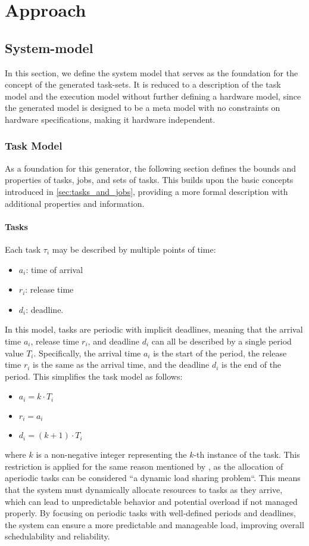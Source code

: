 \chapter{Approach}
\section{System-model}\label{sec:model}
In this section, we define the system model that serves as the foundation for the concept of the generated task-sets.
It is reduced to a description of the task model and the execution model without further defining a hardware model, since the generated model is designed to be a meta model with no constraints on hardware specifications, making it hardware independent.

\subsection{Task Model}\label{sec:task_model}
As a foundation for this generator, the following section defines the bounds and properties of tasks, jobs, and sets of tasks. This builds upon the basic concepts introduced in \cref{sec:tasks_and_jobs}, providing a more formal description with additional properties and information.

\subsubsection{Tasks}\label{sec:task}
Each task $\tau_i$ may be described by multiple points of time:
\begin{itemize}
    \item $a_i$: time of arrival
    \item $r_i$: release time
    \item $d_i$: deadline.
\end{itemize}
In this model, tasks are periodic with implicit deadlines, meaning that the arrival time $a_i$, release time $r_i$, and deadline $d_i$ can all be described by a single period value $T_i$. 
Specifically, the arrival time $a_i$ is the start of the period, the release time $r_i$ is the same as the arrival time, and the deadline $d_i$ is the end of the period. 
This simplifies the task model as follows:
\begin{itemize}
	\item $a_i = k \cdot T_i$
	\item $r_i = a_i$
	\item $d_i = (k + 1) \cdot T_i$
\end{itemize}
where $k$ is a non-negative integer representing the $k$-th instance of the task.
This restriction is applied for the same reason mentioned by \textcite{dar-tzenpengAssignmentSchedulingCommunicating1997}, as the allocation of aperiodic tasks can be considered ``a dynamic load sharing problem``\cite{dar-tzenpengAssignmentSchedulingCommunicating1997}. 
This means that the system must dynamically allocate resources to tasks as they arrive, which can lead to unpredictable behavior and potential overload if not managed properly. 
By focusing on periodic tasks with well-defined periods and deadlines, the system can ensure a more predictable and manageable load, improving overall schedulability and reliability.

